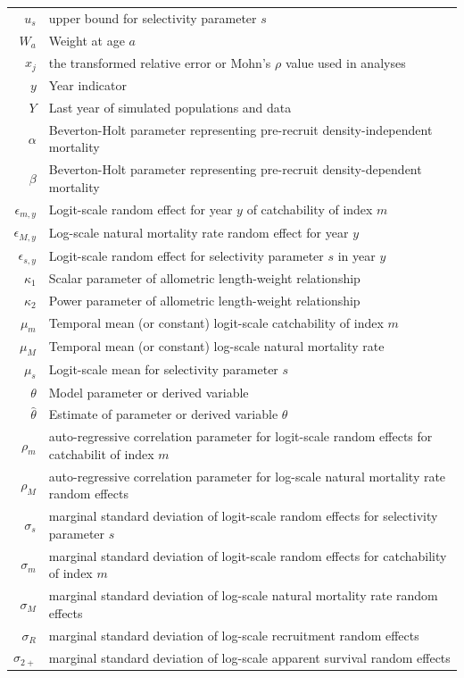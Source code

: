 \begin{longtable}[c]{r p{}}
$u_s$ & upper bound for selectivity parameter $s$\\
$W_a$ & Weight at age $a$\\
$x_j$  & the transformed relative error or Mohn's $\rho$ value used in analyses\\
$y$ & Year indicator\\
$Y$ & Last year of simulated populations and data\\
$\alpha$ & Beverton-Holt parameter representing pre-recruit density-independent mortality\\
$\beta$ & Beverton-Holt parameter representing pre-recruit density-dependent mortality\\
$\epsilon_{m,y}$ & Logit-scale random effect for year $y$ of catchability of index $m$\\
$\epsilon_{M,y}$ & Log-scale natural mortality rate random effect for year $y$\\
$\epsilon_{s,y}$ & Logit-scale random effect for selectivity parameter $s$ in year $y$\\
$\kappa_1$ & Scalar parameter of allometric length-weight relationship\\
$\kappa_2$ & Power parameter of allometric length-weight relationship\\
$\mu_m$ & Temporal mean (or constant) logit-scale catchability of index $m$\\
$\mu_M$ & Temporal mean (or constant) log-scale natural mortality rate\\
$\mu_{s}$ & Logit-scale mean for selectivity parameter $s$\\
$\theta$ & Model parameter or derived variable\\
$\widehat \theta$ & Estimate of parameter or derived variable $\theta$\\
$\rho_m$ & auto-regressive correlation parameter for logit-scale random effects for catchabilit of index $m$\\
$\rho_M$ & auto-regressive correlation parameter for log-scale natural mortality rate random effects\\
$\sigma_s$ & marginal standard deviation of logit-scale random effects for selectivity parameter $s$\\
$\sigma_m$ & marginal standard deviation of logit-scale random effects for catchability of index $m$\\
$\sigma_M$ & marginal standard deviation of log-scale natural mortality rate random effects\\
$\sigma_R$ & marginal standard deviation of log-scale recruitment random effects\\
$\sigma_{2+}$ & marginal standard deviation of log-scale apparent survival random effects\\
\end{longtable}
